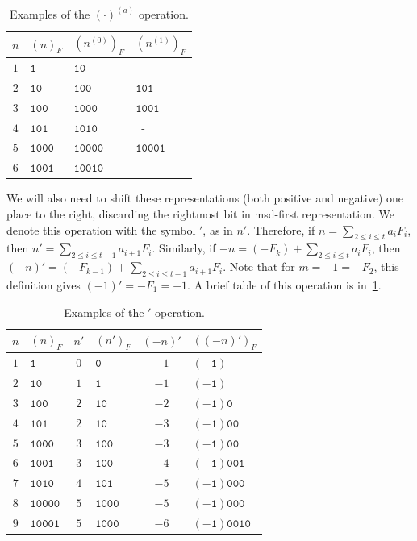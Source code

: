 \documentclass[12pt,runningheads]{llncs}
\newcommand{\tO}{\mathtt{0}}
\newcommand{\tL}{\mathtt{1}}
\begin{document}
\begin{table}[H]
\centering
\begin{tabular}{c|l|l|l}
$n$ & $(n)_F$ & $(n^{(0)})_F$ & $(n^{(1)})_F$ \\ \hline
$1$ & $\tL$ & $\tL\tO$ & \, - \\ 
$2$ & $\tL\tO$ & $\tL\tO\tO$ & $\tL\tO\tL$ \\ 
$3$ & $\tL\tO\tO$ & $\tL\tO\tO\tO$ & $\tL\tO\tO\tL$ \\
$4$ & $\tL\tO\tL$ & $\tL\tO\tL\tO$ & \, - \\
$5$ & $\tL\tO\tO\tO$ & $\tL\tO\tO\tO\tO$ & $\tL\tO\tO\tO\tL$ \\
$6$ & $\tL\tO\tO\tL$ & $\tL\tO\tO\tL\tO$ & \, -  \\
\end{tabular}
\caption{Examples of the $(\cdot)^{(a)}$ operation.}
\end{table}

We will also need to shift these representations (both positive and negative) one place to the right, discarding the rightmost bit in msd-first representation. We denote this operation with the symbol $'$, as in $n'$. Therefore, if $n=\sum_{2 \leq i \leq t} a_i F_{i}$, then $n'=\sum_{2 \leq i \leq t-1} a_{i+1} F_{i}$. Similarly, if $-n=(-F_k)+\sum_{2 \leq i \leq t} a_i F_{i}$, then $(-n)'=(-F_{k-1})+\sum_{2 \leq i \leq t-1} a_{i+1} F_{i}$. Note that for $m = -1 = -F_2$, this definition gives $(-1)' = -F_1=-1$. A brief table of this operation is in~\cref{tab2}.

\begin{table}[H]
\centering
\begin{tabular}{c|l||c|l||c|l}
$n$ & $(n)_F$ & $n'$ & $(n')_F$ & $(-n)'$ & $((-n)')_F$ \\
\hline
$1$ & $\tL$ & $0$ & $\tO$ & $-1$& $(-\tL)$  \\
$2$ & $\tL\tO$ & $1$ & $\tL$ & $-1$ & $(-\tL)$  \\
$3$ & $\tL\tO\tO$ & $2$ & $\tL\tO$ & $-2$ & $(-\tL) \tO$\\
$4$ & $\tL\tO\tL$ & $2$ & $\tL\tO$ & $-3$ & $(-\tL) \tO\tO$\\
$5$ & $\tL\tO\tO\tO$ & $3$ & $\tL\tO\tO$ & $-3$ & $(-\tL) \tO\tO$\\
$6$ & $\tL\tO\tO\tL$ & $3$ & $\tL\tO\tO$ & $-4$ & $(-\tL) \tO\tO\tL$\\
$7$ & $\tL\tO\tL\tO$ & $4$ & $\tL\tO\tL$ & $-5$ & $(-\tL) \tO\tO\tO$\\
$8$ & $\tL\tO\tO\tO\tO$ & $5$ & $\tL\tO\tO\tO$ & $-5$ & $(-\tL) \tO\tO\tO$\\
$9$ & $\tL\tO\tO\tO\tL$ & $5$ & $\tL\tO\tO\tO$ & $-6$ & $(-\tL) \tO\tO\tL\tO$\\
\end{tabular}
\caption{Examples of the ${}'$ operation.}
\label{tab2}
\end{table}
\end{document}
